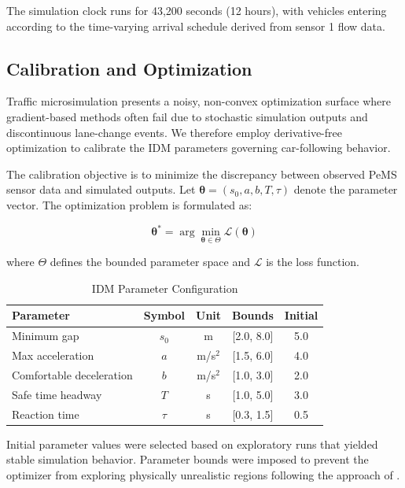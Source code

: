 \documentclass{scspaperproc}
\theoremstyle{scsthe}
\begin{document}
    The simulation clock runs for 43,200 seconds (12 hours), with vehicles entering according to the time-varying arrival schedule derived from sensor 1 flow data.
    \subsection{Calibration and Optimization}

    Traffic microsimulation presents a noisy, non-convex optimization surface where
    gradient-based methods often fail due to stochastic simulation outputs and
    discontinuous lane-change events. We therefore employ derivative-free optimization
    to calibrate the IDM parameters governing car-following behavior.

    The calibration objective is to minimize the discrepancy between observed PeMS
    sensor data and simulated outputs. Let $\boldsymbol{\theta} = (s_0, a, b, T, \tau)$
    denote the parameter vector. The optimization problem is formulated as:

    \begin{equation}
        \boldsymbol{\theta}^* = \arg\min_{\boldsymbol{\theta} \in \Theta} \mathcal{L}(\boldsymbol{\theta})
    \end{equation}

    where $\Theta$ defines the bounded parameter space and $\mathcal{L}$ is the loss function.

    \begin{table}[h]
        \centering
        \caption{IDM Parameter Configuration}
        \begin{tabular}{|l|c|c|c|c|}
            \hline
            Parameter & Symbol & Unit & Bounds & Initial \\
            \hline
            Minimum gap & $s_0$ & m & [2.0, 8.0] & 5.0 \\
            Max acceleration & $a$ & m/s$^2$ & [1.5, 6.0] & 4.0 \\
            Comfortable deceleration & $b$ & m/s$^2$ & [1.0, 3.0] & 2.0 \\
            Safe time headway & $T$ & s & [1.0, 5.0] & 3.0 \\
            Reaction time & $\tau$ & s & [0.3, 1.5] & 0.5 \\
            \hline
        \end{tabular}
        \label{tab:idm_params}
    \end{table}

    Initial parameter values were selected based on exploratory runs that yielded stable simulation behavior. Parameter bounds were imposed to prevent the optimizer from exploring physically unrealistic regions following the approach of \cite{bowman2022microscopic}.
\end{document}
